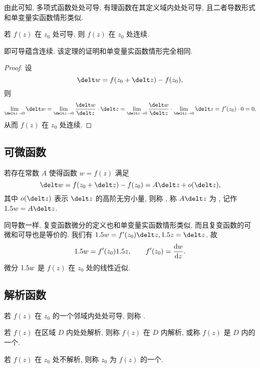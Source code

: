 由此可知, 多项式函数处处可导, 有理函数在其定义域内处处可导, 且二者导数形式和单变量实函数情形类似.

\begin{theorem}
  若 $f(z)$ 在 $z_0$ 处可导, 则 $f(z)$ 在 $z_0$ 处连续.
\end{theorem}

即可导蕴含连续. 该定理的证明和单变量实函数情形完全相同.

\begin{proof}
  设
  \[
    \delt w=f(z_0+\delt z)-f(z_0),
  \]
  则
  \[
    \lim_{\delt z\ra 0}\delt w
    =\lim_{\delt z\ra 0}\frac{\delt w}{\delt z}\cdot\delt z
    =\lim_{\delt z\ra 0}\frac{\delt w}{\delt z}
      \cdot\lim_{\delt z\ra 0}\delt z
    =f'(z_0)\cdot 0=0.
  \]
  从而 $f(z)$ 在 $z_0$ 处连续.
\end{proof}


\subsection{可微函数}

\begin{definition}
  若存在常数 $A$ 使得函数 $w=f(z)$ 满足
  \[
     \delt w
    =f(z_0+\delt z)-f(z_0)
    =A\delt z+o(\delt z),
  \]
  其中 $o(\delt z)$ 表示 $\delt z$ 的高阶无穷小量, 则称 , 称 $A\delt z$ 为 , 记作 $\d w=A \delt z$.
\end{definition}

同导数一样, 复变函数微分的定义也和单变量实函数情形类似, 而且复变函数的可微和可导也是等价的.
我们有 $\d w=f'(z_0)\delt z, \d z=\delt z$.
故
\[
  \d w=f'(z_0)\d z,\qquad 
  f'(z_0)=\odv wz.
\]
微分 $1.5 w$ 是 $f(z)$ 在 $z_0$ 处的线性近似.


\subsection{解析函数}

\begin{definition}
  \begin{enuma}
    \item 若 $f(z)$ 在 $z_0$ 的一个邻域内处处可导, 则称 .
    \item 若 $f(z)$ 在区域 $D$ 内处处解析, 则称 $f(z)$ 在 $D$ 内解析, 或称 $f(z)$ 是 $D$ 内的一个.\footnotemark
    \item 若 $f(z)$ 在 $z_0$ 处不解析, 则称 $z_0$ 为 $f(z)$ 的一个.
  \end{enuma}
\end{definition}

